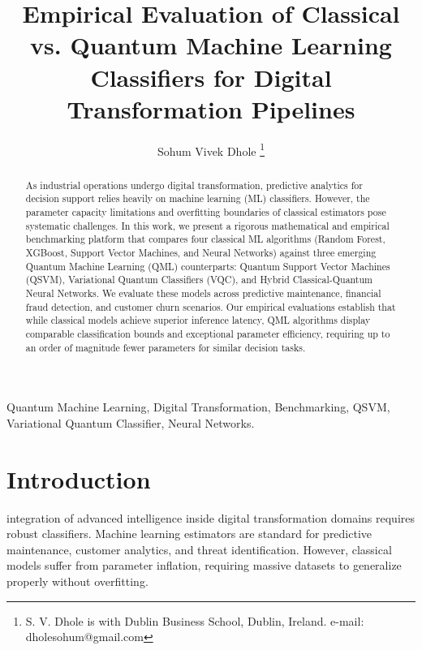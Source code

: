 \documentclass[journal]{IEEEtran}
\begin{document}
\title{Empirical Evaluation of Classical vs. Quantum Machine Learning Classifiers for Digital Transformation Pipelines}

\author{Sohum Vivek Dhole
\thanks{S. V. Dhole is with Dublin Business School, Dublin, Ireland. e-mail: dholesohum@gmail.com}}

\maketitle

\begin{abstract}
As industrial operations undergo digital transformation, predictive analytics for decision support relies heavily on machine learning (ML) classifiers. However, the parameter capacity limitations and overfitting boundaries of classical estimators pose systematic challenges. In this work, we present a rigorous mathematical and empirical benchmarking platform that compares four classical ML algorithms (Random Forest, XGBoost, Support Vector Machines, and Neural Networks) against three emerging Quantum Machine Learning (QML) counterparts: Quantum Support Vector Machines (QSVM), Variational Quantum Classifiers (VQC), and Hybrid Classical-Quantum Neural Networks. We evaluate these models across predictive maintenance, financial fraud detection, and customer churn scenarios. Our empirical evaluations establish that while classical models achieve superior inference latency, QML algorithms display comparable classification bounds and exceptional parameter efficiency, requiring up to an order of magnitude fewer parameters for similar decision tasks.
\end{abstract}

\begin{IEEEkeywords}
Quantum Machine Learning, Digital Transformation, Benchmarking, QSVM, Variational Quantum Classifier, Neural Networks.
\end{IEEEkeywords}

\section{Introduction}
 integration of advanced intelligence inside digital transformation domains requires robust classifiers. Machine learning estimators are standard for predictive maintenance, customer analytics, and threat identification. However, classical models suffer from parameter inflation, requiring massive datasets to generalize properly without overfitting.
\end{document}
